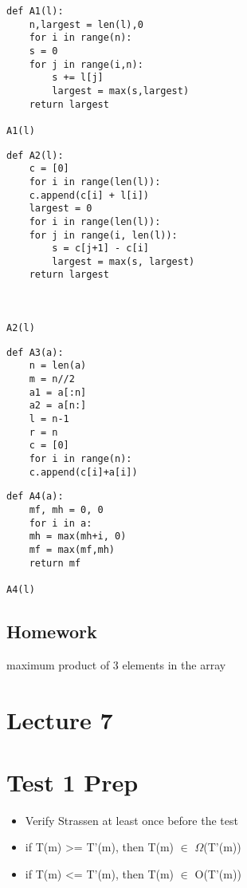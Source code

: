 \documentclass[12pt]{article}
\begin{document}
\lstset{language=Python,label= ,caption= ,numbers=none}
\begin{lstlisting}
def A1(l):
    n,largest = len(l),0
    for i in range(n):
	s = 0
	for j in range(i,n):
	    s += l[j]
	    largest = max(s,largest)
    return largest

A1(l)
\end{lstlisting}

\lstset{language=Python,label= ,caption= ,numbers=none}
\begin{lstlisting}
def A2(l):
    c = [0]
    for i in range(len(l)):
	c.append(c[i] + l[i])
    largest = 0
    for i in range(len(l)):
	for j in range(i, len(l)):
	    s = c[j+1] - c[i]
	    largest = max(s, largest)
    return largest



A2(l)
\end{lstlisting}

\lstset{language=Python,label= ,caption= ,numbers=none}
\begin{lstlisting}
def A3(a):
    n = len(a)
    m = n//2
    a1 = a[:n]
    a2 = a[n:]
    l = n-1
    r = n
    c = [0]
    for i in range(n):
	c.append(c[i]+a[i])
\end{lstlisting}

\lstset{language=Python,label= ,caption= ,numbers=none}
\begin{lstlisting}
def A4(a):
    mf, mh = 0, 0
    for i in a:
	mh = max(mh+i, 0)
	mf = max(mf,mh)
    return mf

A4(l)
\end{lstlisting}

\subsection{Homework}
\label{sec-7-1}

maximum product of 3 elements in the array

\section{Lecture 7}
\label{sec-8}

\section{Test 1 Prep}
\label{sec-9}

\begin{itemize}
\item Verify Strassen at least once before the test
\item if T(m) >= T'(m), then T(m) $\in$ $\Omega$(T'(m))
\item if T(m) <= T'(m), then T(m) $\in$ O(T'(m))
\end{itemize}
\end{document}
